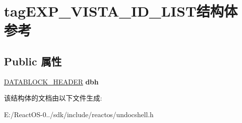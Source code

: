 \hypertarget{structtag_e_x_p___v_i_s_t_a___i_d___l_i_s_t}{}\section{tag\+E\+X\+P\+\_\+\+V\+I\+S\+T\+A\+\_\+\+I\+D\+\_\+\+L\+I\+S\+T结构体 参考}
\label{structtag_e_x_p___v_i_s_t_a___i_d___l_i_s_t}
\subsection*{Public 属性}
\begin{DoxyCompactItemize}
\item 
\mbox{\label{structtag_e_x_p___v_i_s_t_a___i_d___l_i_s_t_a235653b08eee3beff993077667f403c6}} 
\hyperlink{structtag_d_a_t_a_b_l_o_c_k_h_e_a_d_e_r}{D\+A\+T\+A\+B\+L\+O\+C\+K\+\_\+\+H\+E\+A\+D\+ER} {\bfseries dbh}
\end{DoxyCompactItemize}


该结构体的文档由以下文件生成\+:\begin{DoxyCompactItemize}
\item 
E\+:/\+React\+O\+S-\/0../sdk/include/reactos/undocshell.\+h\end{DoxyCompactItemize}
